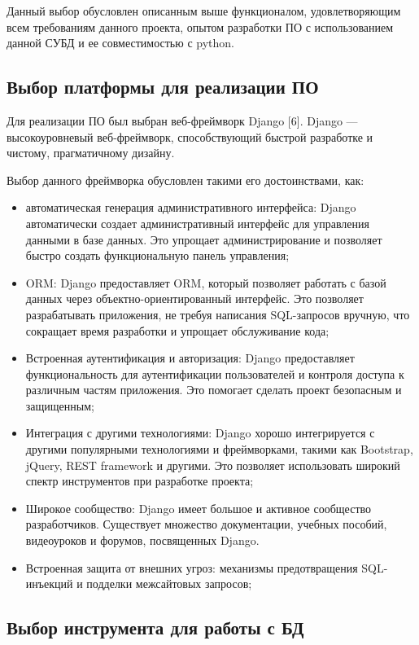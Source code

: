 Данный выбор обусловлен описанным выше функционалом, удовлетворяющим всем требованиям данного проекта, опытом разработки ПО с использованием данной СУБД и ее совместимостью с python.

\subsection{Выбор платформы для реализации ПО}

Для реализации ПО был выбран веб-фреймворк Django [6].
Django --- высокоуровневый веб-фреймворк, способствующий быстрой разработке и чистому, прагматичному дизайну.

Выбор данного фреймворка обусловлен такими его достоинствами, как:

\begin{itemize}
	\item автоматическая генерация административного интерфейса: Django автоматически создает административный интерфейс для управления данными в базе данных. Это упрощает администрирование и позволяет быстро создать функциональную панель управления;
	\item ORM: Django предоставляет ORM, который позволяет работать с базой данных через объектно-ориентированный интерфейс. Это позволяет разрабатывать приложения, не требуя написания SQL-запросов вручную, что сокращает время разработки и упрощает обслуживание кода;
	\item Встроенная аутентификация и авторизация: Django предоставляет функциональность для аутентификации пользователей и контроля доступа к различным частям приложения. Это помогает сделать проект безопасным и защищенным;
	\item Интеграция с другими технологиями: Django хорошо интегрируется с другими популярными технологиями и фреймворками, такими как Bootstrap, jQuery, REST framework и другими. Это позволяет использовать широкий спектр инструментов при разработке проекта;
	\item Широкое сообщество: Django имеет большое и активное сообщество разработчиков. Существует множество документации, учебных пособий, видеоуроков и форумов, посвященных Django.
	\item Встроенная защита от внешних угроз: механизмы предотвращения SQL-инъекций и подделки межсайтовых запросов;
\end{itemize}

\subsection{Выбор инструмента для работы с БД}

